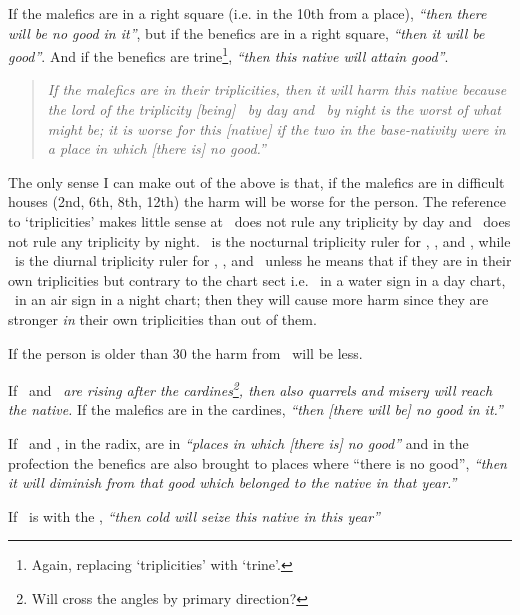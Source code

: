 If  the malefics are in a right square (i.e. in the 10th from a place), \textsl{``then there will be no good in it''}, but if the benefics are in a right square, \textsl{``then it will be good''}. And if the benefics are trine\footnote{Again, replacing `triplicities' with `trine'.}, \textsl{``then this native will attain good''}.

\begin{quote}
\textsl{If the malefics are in their triplicities, then it will harm this native because the lord of the triplicity [being] \Mars\, by day and \Saturn\, by night is the worst of what might be; it is worse for this [native] if the two in the base-nativity were in a place in which [there is] no good.''}
\end{quote}

\begin{mdframed}[backgroundcolor=cyan!5, rightmargin=1em, leftmargin=1em]
The only sense I can make out of the above is that, if the malefics are in difficult houses (2nd, 6th, 8th, 12th) the harm will be worse for the person. The reference to `triplicities' makes little sense at \Mars\, does not rule any triplicity by day and \Saturn\, does not rule any triplicity by night. \Mars\, is the nocturnal triplicity ruler for \Cancer, \Scorpio, and \Pisces, while \Saturn\, is the diurnal triplicity ruler for \Gemini, \Libra, and \Aquarius\, unless he means that if they are in their own triplicities but contrary to the chart sect i.e. \Mars\, in a water sign in a day chart, \Saturn\, in an air sign in a night chart; then they will cause more harm since they are stronger \textsl{in} their own triplicities than out of them.
\end{mdframed}

If  the person is older than 30 the harm from \Saturn\, will be less.

If  \Saturn\, and \Mars\, \textsl{are rising after the cardines\footnote{Will cross the angles by primary direction?}, then also quarrels and misery will reach the native.} If the malefics are in the cardines, \textsl{``then [there will be] no good in it.''}

If  \Saturn\, and \Mars, in the radix, are in \textsl{``places in which [there is] no good''} and in the profection the benefics are also brought to places where ``there is no good'', \textsl{``then it will diminish from that good which belonged to the native in that year.''}

If  \Saturn\, is with the \Moon, \textsl{``then cold will seize this native in this year''}

